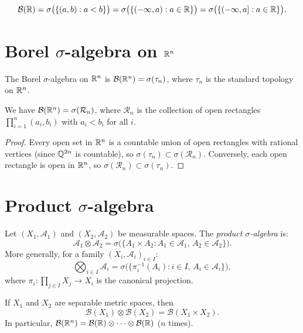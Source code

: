 \begin{keyformulas}[title=\textbf{Common generators of $\mathcal{B}(\R)$}]
\[
\mathcal{B}(\mathbb{R}) = \sigma\bigl(\{(a,b) : a < b\}\bigr)
= \sigma\bigl(\{(-\infty, a) : a \in \mathbb{R}\}\bigr)
= \sigma\bigl(\{(-\infty, a] : a \in \mathbb{R}\}\bigr).
\]
\end{keyformulas}

\section{Borel $\sigma$-algebra on $\mathbb{R}^n$}

\begin{definition}
The Borel $\sigma$-algebra on $\mathbb{R}^n$ is $\mathcal{B}(\mathbb{R}^n) = \sigma(\tau_n)$, where
$\tau_n$ is the standard topology on $\mathbb{R}^n$.
\end{definition}

\begin{proposition}
We have $\mathcal{B}(\mathbb{R}^n) = \sigma(\mathcal{R}_n)$, where $\mathcal{R}_n$ is the
collection of open rectangles
$\prod_{i=1}^n (a_i, b_i)$ with $a_i < b_i$ for all $i$.
\end{proposition}

\begin{proof}
Every open set in $\mathbb{R}^n$ is a countable union of open rectangles with rational
vertices (since $\mathbb{Q}^{2n}$ is countable), so
$\sigma(\tau_n) \subset \sigma(\mathcal{R}_n)$. Conversely, each open rectangle is
open in $\mathbb{R}^n$, so $\sigma(\mathcal{R}_n) \subset \sigma(\tau_n)$.
\end{proof}

\section{Product $\sigma$-algebra}

\begin{definition}
Let $(X_1, \mathcal{A}_1)$ and $(X_2, \mathcal{A}_2)$ be measurable spaces. The
\emph{product $\sigma$-algebra} is:
\[
\mathcal{A}_1 \otimes \mathcal{A}_2 = \sigma\bigl(\{A_1 \times A_2 :
A_1 \in \mathcal{A}_1,\, A_2 \in \mathcal{A}_2\}\bigr).
\]
More generally, for a family $(X_i, \mathcal{A}_i)_{i \in I}$:
\[
\bigotimes_{i \in I} \mathcal{A}_i = \sigma\bigl(\{\pi_i^{-1}(A_i) :
i \in I,\, A_i \in \mathcal{A}_i\}\bigr),
\]
where $\pi_i : \prod_{j \in I} X_j \to X_i$ is the canonical projection.
\end{definition}

\begin{theorem}
\label{thm:borel_product}
If $X_1$ and $X_2$ are separable metric spaces, then
\[
\mathcal{B}(X_1) \otimes \mathcal{B}(X_2) = \mathcal{B}(X_1 \times X_2).
\]
In particular, $\mathcal{B}(\mathbb{R}^n) = \mathcal{B}(\mathbb{R}) \otimes \cdots \otimes
\mathcal{B}(\mathbb{R})$ ($n$ times).
\end{theorem}

